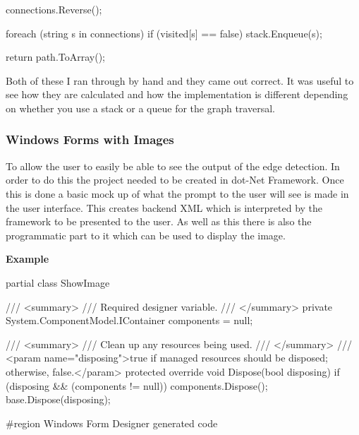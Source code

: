 \begin{FlushLeft}
\begin{cscode}
{{        connections.Reverse();

        foreach (string s in connections)
        {
            if (visited[s] == false)
            {
                stack.Enqueue(s);
            }
        }
    }

    return path.ToArray();
}
        \end{cscode}

        Both of these I ran through by hand and they came out correct. It was useful to see how they are calculated and how the implementation is different depending on whether you use a stack or a queue for the graph traversal.
        
        \subsubsection{Windows Forms with Images}
        To allow the user to easily be able to see the output of the edge detection. In order to do this the project needed to be created in dot-Net Framework. Once this is done a basic mock up of what the prompt to the user will see is made in the user interface. This creates backend XML which is interpreted by the framework to be presented to the user. As well as this there is also the programmatic part to it which can be used to display the image. \\ \bk
        
        \textbf{Example}

        \begin{cscode}
partial class ShowImage
{
    /// <summary>
    /// Required designer variable.
    /// </summary>
    private System.ComponentModel.IContainer components = null;

    /// <summary>
    /// Clean up any resources being used.
    /// </summary>
    /// <param name="disposing">true if managed resources should be disposed; otherwise, false.</param>
    protected override void Dispose(bool disposing)
    {
        if (disposing && (components != null))
        {
            components.Dispose();
        }
        base.Dispose(disposing);
    }

    #region Windows Form Designer generated code

}
\end{cscode}
\end{FlushLeft}
